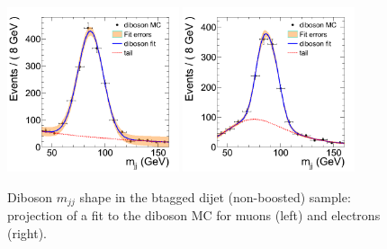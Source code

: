 \begin{figure}
\begin{center}
\includegraphics[width=0.45\textwidth]{figs/wpj/DibosonBtaglnujj_diboson_muon_2jets.png}
\includegraphics[width=0.45\textwidth]{figs/wpj/DibosonBtaglnujj_diboson_electron_2jets.png}
\end{center}
\caption{\label{fig:dibosonFit} Diboson $m_{jj}$ shape in the btagged dijet (non-boosted) sample: projection of a fit to the diboson MC for muons (left) and electrons (right).}
\label{fig:dibosonFit_Dijet_btag}
\end{figure}
